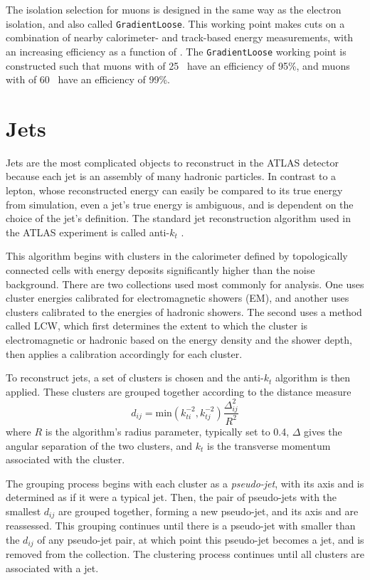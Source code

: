 The isolation selection for muons is designed in the same way as the electron isolation, and also called \texttt{GradientLoose}. This working point makes cuts on a combination of nearby calorimeter- and track-based energy measurements, with an increasing efficiency as a function of \pt. The \texttt{GradientLoose} working point is constructed such that muons with \pt of 25 \gev~have an efficiency of 95\%, and muons with \pt of 60 \gev~have an efficiency of 99\%. 

\section{Jets}
\label{sec:reco_jets}

Jets are the most complicated objects to reconstruct in the \ac{ATLAS} detector because each jet is an assembly of many hadronic particles. In contrast to a lepton, whose reconstructed energy can easily be compared to its true energy from simulation, even a jet's true energy is ambiguous, and is dependent on the choice of the jet's definition. The standard jet reconstruction algorithm used in the \ac{ATLAS} experiment is called anti-$k_t$ \cite{Cacciari:2008gp}. 

This algorithm begins with clusters in the calorimeter defined by topologically connected cells with energy deposits significantly higher than the noise background. There are two collections used most commonly for analysis. One uses cluster energies calibrated for electromagnetic showers (\acs{EM}), and another uses clusters calibrated to the energies of hadronic showers. The second uses a method called \ac{LCW}, which first determines the extent to which the cluster is electromagnetic or hadronic based on the energy density and the shower depth, then applies a calibration accordingly for each cluster.

To reconstruct jets, a set of clusters is chosen and the anti-$k_t$ algorithm is then applied. These clusters are grouped together according to the distance measure
%
\begin{equation}
d_{ij} = \mathrm{min}(k^{-2}_{ti}, k^{-2}_{tj}) \frac{\Delta_{ij}^2}{R^2}
\end{equation}
%
where $R$ is the algorithm's radius parameter, typically set to 0.4, $\Delta$ gives the angular separation of the two clusters, and $k_t$ is the transverse momentum associated with the cluster. 

The grouping process begins with each cluster as a \textit{pseudo-jet}, with its axis and \pt is determined as if it were a typical jet. Then, the pair of pseudo-jets with the smallest $d_{ij}$ are grouped together, forming a new pseudo-jet, and its axis and \pt are reassessed. This grouping continues until there is a pseudo-jet with \pt smaller than the $d_{ij}$ of any pseudo-jet pair, at which point this pseudo-jet becomes a jet, and is removed from the collection. The clustering process continues until all clusters are associated with a jet. 

